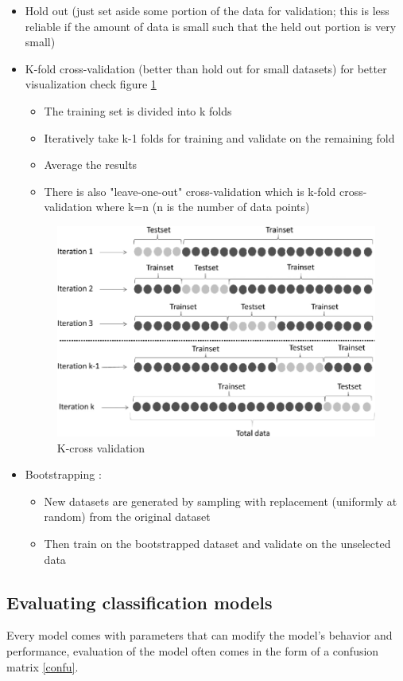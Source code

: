 \begin{itemize}
\item Hold out (just set aside some portion of the data for validation; this is less reliable if the amount of data is small such that the held out portion is very small) 
\item K-fold cross-validation (better than hold out for small datasets) for better visualization  check figure \ref{fig:cross}
%
\begin{itemize}
\item The training set is divided into k folds
\item Iteratively take k-1 folds for training and validate on the remaining fold
\item Average the results
\item There is also "leave-one-out" cross-validation which is k-fold cross-validation where k=n (n is the number of data points)
\end{itemize}
%
%
\begin{figure}[H]
\centering
\includegraphics[scale=0.9]{img/cross.png}
\caption{K-cross validation }
\label{fig:cross}
\end{figure}
%
\item Bootstrapping : 
\begin{itemize}
\item New datasets are generated by sampling with replacement (uniformly at random) from the original dataset
\item Then train on the bootstrapped dataset and validate on the unselected data
\end{itemize}
\end{itemize}
%
\subsection{Evaluating classification models}\label{eva}
Every model comes with parameters that can modify the model's behavior and performance, evaluation of the model  often comes in the form of a confusion matrix \ref{confu}.

